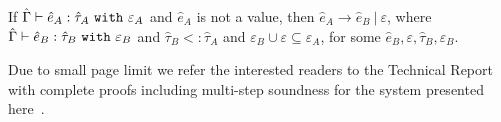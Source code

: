 \begin{theorem}
If $\hat \Gamma \vdash \hat e_A: \hat \tau_A~\mathtt{with}~ \varepsilon_A$ and $\hat e_A$ is not a value, then $\hat e_A \longrightarrow \hat e_B~|~\varepsilon$, where $\hat \Gamma \vdash \hat e_B: \hat \tau_B~\mathtt{with}~ \varepsilon_B$ and $\hat \tau_B <: \hat \tau_A$ and $\varepsilon_B \cup \varepsilon \subseteq \varepsilon_A$, for some $\hat e_B, \varepsilon, \hat \tau_B, \varepsilon_B$.
\end{theorem}

Due to small page limit we refer the interested readers to the Technical Report with complete proofs including multi-step soundness for the system presented here~\cite{ecs:2018:aaron-tr}.